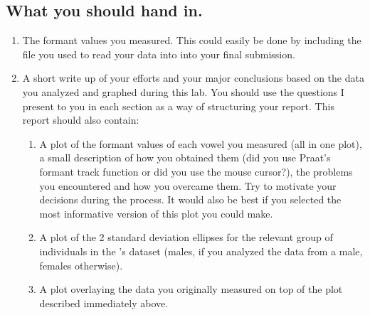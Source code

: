 \subsection{What you should hand in.}

\begin{enumerate}
%
\item The formant values you measured. This could easily be done by including the  file you used to read your data into \Praat{} into your final submission.
%
\item A short write up of your efforts and your major conclusions based on the data you analyzed and graphed during this lab. You should use the questions I present to you in each section as a way of structuring your report. This report should also contain:
% 
   \begin{enumerate}
   \item A plot of the formant values of each vowel you measured (all in one plot), a small description of how you obtained them (did you use Praat's formant track function or did you use the mouse cursor?), the problems you encountered and how you overcame them. Try to motivate your decisions during the process. It would also be best if you selected the most informative version of this plot you could make.
   \item A plot of the 2 standard deviation ellipses for the relevant group of individuals in the 's dataset (males, if you analyzed the data from a male, females otherwise).
   \item A plot overlaying the data you originally measured on top of the plot described immediately above.
   \end{enumerate}
%
\end{enumerate}
